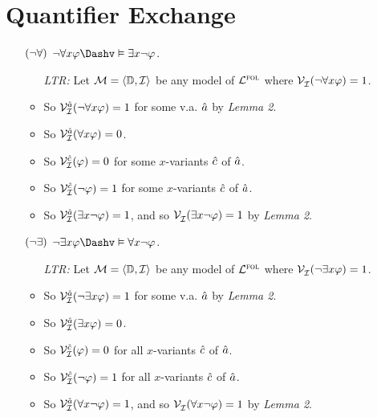 \documentclass[a4paper, 11pt]{article} %
\begin{document}
\section*{Quantifier Exchange}

\begin{enumerate}
  \item[$({\neg}{\forall})$] $\enot\forall x \varphi \Dashv\vDash \exists x\enot \varphi$.
    \begin{itemize}
      \item[\it LTR:] Let $\mathcal{M}=\langle\mathbb{D},\mathcal{I}\rangle$ be any model of $\mathcal{L}^{\textsc{fol}}$ where $\mathcal{V}_{\mathcal{I}}^{}(\neg\forall x \varphi) = 1$.
      \item So $\mathcal{V}_{\mathcal{I}}^{\hat{a}}(\neg\forall x \varphi)=1$ for some v.a. $\hat{a}$ by \textit{Lemma 2}.
      \item So $\mathcal{V}_{\mathcal{I}}^{\hat{a}}(\forall x \varphi) = 0$.
      \item So $\mathcal{V}_{\mathcal{I}}^{\hat{c}}(\varphi) = 0$ for some $x$-variants $\hat{c}$ of $\hat{a}$.
      \item So $\mathcal{V}_{\mathcal{I}}^{\hat{c}}(\neg\varphi) = 1$ for some $x$-variants $\hat{c}$ of $\hat{a}$.
      \item So $\mathcal{V}_{\mathcal{I}}^{\hat{a}}(\exists x\neg\varphi)=1$, and so $\mathcal{V}_{\mathcal{I}}^{}(\exists x\neg\varphi)=1$ by \textit{Lemma 2}.
    \end{itemize}
  \item[$({\neg}{\exists})$] $\enot\exists x \varphi \Dashv\vDash \forall x\enot \varphi$.
    \begin{itemize}
      \item[\it LTR:] Let $\mathcal{M}=\langle\mathbb{D},\mathcal{I}\rangle$ be any model of $\mathcal{L}^{\textsc{fol}}$ where $\mathcal{V}_{\mathcal{I}}^{}(\neg\exists x \varphi) = 1$.
      \item So $\mathcal{V}_{\mathcal{I}}^{\hat{a}}(\neg\exists x \varphi)=1$ for some v.a. $\hat{a}$ by \textit{Lemma 2}.
      \item So $\mathcal{V}_{\mathcal{I}}^{\hat{a}}(\exists x \varphi) = 0$.
      \item So $\mathcal{V}_{\mathcal{I}}^{\hat{c}}(\varphi) = 0$ for all $x$-variants $\hat{c}$ of $\hat{a}$.
      \item So $\mathcal{V}_{\mathcal{I}}^{\hat{c}}(\neg\varphi) = 1$ for all $x$-variants $\hat{c}$ of $\hat{a}$.
      \item So $\mathcal{V}_{\mathcal{I}}^{\hat{a}}(\forall x\neg\varphi) = 1$, and so $\mathcal{V}_{\mathcal{I}}^{}(\forall x\neg\varphi)=1$ by \textit{Lemma 2}.
    \end{itemize}
\end{enumerate}
\end{document}
